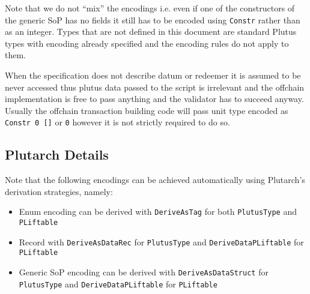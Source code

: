 \documentclass{article}
\begin{document}
Note that we do not ``mix'' the encodings i.e. even if one of the constructors of the generic SoP has no fields it still has to be encoded using \verb|Constr| rather than as an integer.
Types that are not defined in this document are standard Plutus types with encoding already specified and the encoding rules do not apply to them.

When the specification does not describe datum or redeemer it is assumed to be never accessed thus plutus data passed to the script is irrelevant and the offchain implementation is free to pass anything and the validator has to succeed anyway.
Usually the offchain transaction building code will pass unit type encoded as \verb|Constr 0 []| or \verb|0| however it is not strictly required to do so.

\subsection{Plutarch Details}

Note that the following encodings can be achieved automatically using Plutarch's derivation strategies, namely:

\begin{itemize}
  \item Enum encoding can be derived with \verb|DeriveAsTag| for both \verb|PlutusType| and \verb|PLiftable|
  \item Record with \verb|DeriveAsDataRec| for \verb|PlutusType| and \allowbreak \verb|DeriveDataPLiftable| for \verb|PLiftable|
  \item Generic SoP encoding can be derived with \verb|DeriveAsDataStruct| for \verb|PlutusType| and \verb|DeriveDataPLiftable| for \verb|PLiftable|
\end{itemize}
\end{document}
